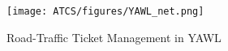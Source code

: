 \documentclass[../Relazione.tex]{subfiles}
\begin{document}
    \begin{figure}[!ht]
        \centering
        \texttt{[image: ATCS/figures/YAWL\_net.png]}
        \caption{Road-Traffic Ticket Management in YAWL}
        \label{fig:YAWL_net}
    \end{figure}
    
\end{document}
